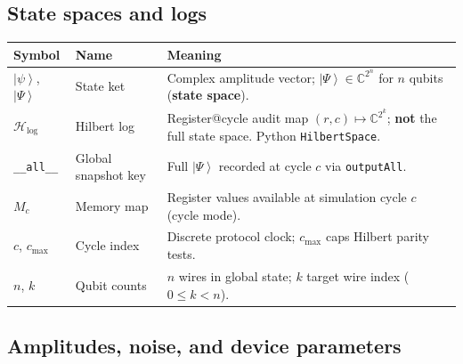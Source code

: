 \documentclass[11pt,a4paper]{article}
\newcommand{\C}{\mathbb{C}}
\newcommand{\ket}[1]{\left|#1\right\rangle}
\newcommand{\HS}{\mathcal{H}_{\mathrm{log}}}
\begin{document}
\subsection{State spaces and logs}

\begin{center}
\small
\begin{longtable}{@{}p{2.2cm}p{4.2cm}p{7.5cm}@{}}
\toprule
Symbol & Name & Meaning \\
\midrule
\endhead
$\ket{\psi}$, $\ket{\Psi}$ & State ket & Complex amplitude vector; $\ket{\Psi}\in\C^{2^n}$ for $n$ qubits (\textbf{state space}). \\
$\HS$ & Hilbert log & Register@cycle audit map $(r,c)\mapsto\C^{2^k}$; \textbf{not} the full state space. Python \texttt{HilbertSpace}. \\
\texttt{\_\_all\_\_} & Global snapshot key & Full $\ket{\Psi}$ recorded at cycle $c$ via \texttt{outputAll}. \\
$M_c$ & Memory map & Register values available at simulation cycle $c$ (cycle mode). \\
$c$, $c_{\max}$ & Cycle index & Discrete protocol clock; $c_{\max}$ caps Hilbert parity tests. \\
$n$, $k$ & Qubit counts & $n$ wires in global state; $k$ target wire index ($0\le k<n$). \\
\bottomrule
\end{longtable}
\end{center}

\subsection{Amplitudes, noise, and device parameters}
\end{document}
